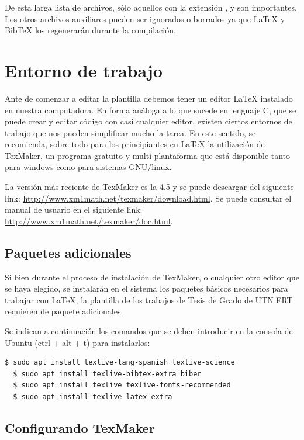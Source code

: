 De esta larga lista de archivos, sólo aquellos con la extensión ,  y  son importantes.  Los otros archivos auxiliares pueden ser ignorados o borrados ya que \LaTeX{} y BibTeX los regenerarán durante la compilación.


\section{Entorno de trabajo}

Ante de comenzar a editar la plantilla debemos tener un editor \LaTeX{} instalado en nuestra computadora.  En forma análoga a lo que sucede en lenguaje C, que se puede crear y editar código con casi cualquier editor, existen ciertos entornos de trabajo que nos pueden simplificar mucho la tarea.  En este sentido, se recomienda, sobre todo para los principiantes en \LaTeX{} la utilización de TexMaker, un programa gratuito y multi-plantaforma que está disponible tanto para windows como para sistemas GNU/linux.

La versión más reciente de TexMaker es la 4.5 y se puede descargar del siguiente link: \url{http://www.xm1math.net/texmaker/download.html}. Se puede consultar el manual de usuario en el siguiente link: \url{http://www.xm1math.net/texmaker/doc.html}.
 

\subsection{Paquetes adicionales}

Si bien durante el proceso de instalación de TexMaker, o cualquier otro editor que se haya elegido, se instalarán en el sistema los paquetes básicos necesarios para trabajar con \LaTeX{}, la plantilla de los trabajos de Tesis de Grado de UTN FRT requieren de paquete adicionales.

Se indican a continuación los comandos que se deben introducir en la consola de Ubuntu (ctrl + alt + t) para instalarlos:

\begin{lstlisting}[language=bash]
  $ sudo apt install texlive-lang-spanish texlive-science 
  $ sudo apt install texlive-bibtex-extra biber
  $ sudo apt install texlive texlive-fonts-recommended
  $ sudo apt install texlive-latex-extra
\end{lstlisting}


\subsection{Configurando TexMaker}
\label{subsec:configurando}



